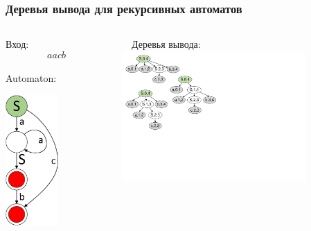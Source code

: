 \documentclass{beamer}
\begin{document}
	\begin{frame} 
		\frametitle{Деревья вывода для рекурсивных автоматов}
		\begin{columns}
			\begin{column}{3.7cm}
				Вход: $$aacb$$ \\
				\vspace{10pt}
				Automaton: \\
				\vspace{5pt}
				\begin{center}
					\includegraphics[width=2cm]{pictures/G0minimizedAutomaton.pdf}
				\end{center}
			\end{column}
		
     		\begin{column}{6cm}
     			\ \ Деревья вывода:\\
     			\vspace{5pt}
     			\includegraphics[width=7cm]{pictures/G0trees.pdf}
			\end{column}
		
		\end{columns}
	\end{frame}
	
\end{document}
